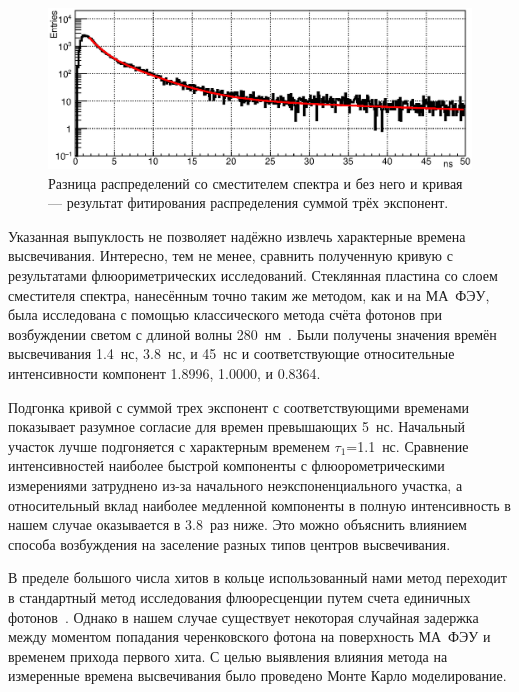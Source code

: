 \begin{figure}[H]
\centering
\includegraphics[width=1.0\textwidth]{pictures/27_WLSdiff_8feb.eps}
\caption{Разница распределений со сместителем спектра и без него и кривая --- результат фитирования распределения суммой трёх экспонент.}
\label{fig:WLSdiff}
\end{figure}

Указанная выпуклость не позволяет надёжно извлечь характерные времена высвечивания. Интересно, тем не менее, сравнить полученную кривую с результатами флюориметрических исследований. Стеклянная пластина со слоем сместителя спектра, нанесённым точно таким же методом, как и на МА~ФЭУ, была исследована с помощью классического метода счёта фотонов при возбуждении светом с длиной волны 280~нм~\cite{DUERR}. Были получены значения времён высвечивания 1.4~нс, 3.8~нс, и 45~нс и соответствующие относительные интенсивности компонент 1.8996, 1.0000, и 0.8364.




Подгонка кривой с  суммой трех экспонент с соответствующими временами показывает разумное согласие для времен превышающих 5~нс. Начальный участок лучше подгоняется с характерным временем $\tau_{1}$=1.1~нс. Сравнение интенсивностей наиболее быстрой компоненты с флюорометрическими измерениями затруднено из-за начального неэкспоненциального участка, а относительный вклад наиболее медленной компоненты в полную интенсивность в нашем случае оказывается в 3.8~раз ниже. Это можно объяснить влиянием способа возбуждения на заселение разных типов центров высвечивания.

В пределе большого числа хитов в кольце использованный нами метод переходит в стандартный метод исследования флюоресценции путем счета единичных фотонов~\cite{SPC}. Однако в нашем случае существует некоторая случайная задержка между моментом попадания черенковского фотона на поверхность МА~ФЭУ и временем прихода первого хита. С целью выявления влияния метода на измеренные времена высвечивания было проведено Монте Карло моделирование.

